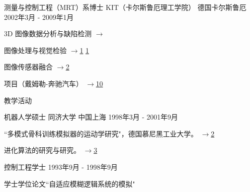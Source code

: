 \documentclass[../cv_xin_cn.tex]{subfiles}
\begin{document}
\begin{cventries}
  \cventry
    {测量与控制工程（MRT）系博士} %
    {KIT（卡尔斯鲁厄理工学院）} %
    {德国卡尔斯鲁厄} %
    {2002年3月 - 2009年1月} %
    {
      \begin{cvitems} %
        \item 3D 图像数据分析与缺陷检测 \hyperlink{xin2008diss}{$\rightarrow$}
        \item 图像处理与视觉检验 \hyperlink{xin2009multiscale}{$\rightarrow$1} \hyperlink{xin2007evaluation}{1}
        \item 图像传感器融合 \hyperlink{xin2004bildfolgenauswertung}{$\rightarrow$2}
        \item 项目（戴姆勒-奔驰汽车） \hyperlink{Xin_Daimler_08}{$\rightarrow$10}
        \item 教学活动
      \end{cvitems}
    }

  \cventry
    {机器人学硕士} %
    {同济大学} %
    {中国上海} %
    {1998年3月 - 2001年9月} %
    {
      \begin{cvitems} %
        \item ``多模式骨科训练模拟器的运动学研究"，德国慕尼黑工业大学。 \hyperlink{xin2002KneeSimulator}{$\rightarrow$2}
        \item 进化算法的研究与研究。 \hyperlink{xin2002AntColony}{$\rightarrow$3}
      \end{cvitems}
    }

  \cventry
    {控制工程学士} %
    {} %
    {} %
    {1993年9月 - 1998年9月} %
    {
      \begin{cvitems} %
        \item 学士学位论文``自适应模糊逻辑系统的模拟"
      \end{cvitems}
    }

\end{cventries}
\end{document}
